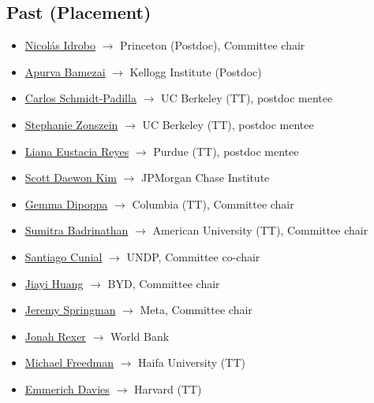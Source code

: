 \documentclass[10pt,a4paper]{article}
\begin{document}
\subsection*{Past (Placement)}
\begin{itemize}[leftmargin=1em, itemsep=1pt, topsep=2pt, label=\textcolor{secondary}{$\bullet$}]
\item \href{https://idrobo.github.io}{Nicol\'{a}s Idrobo} $\rightarrow$ Princeton (Postdoc), Committee chair
\item \href{https://www.apurvabamezai.com}{Apurva Bamezai} $\rightarrow$ Kellogg Institute (Postdoc)
\item \href{https://cschmidtpadilla.github.io/}{Carlos Schmidt-Padilla} $\rightarrow$ UC Berkeley (TT), postdoc mentee
\item \href{https://stephaniezonszein.com/}{Stephanie Zonszein} $\rightarrow$ UC Berkeley (TT), postdoc mentee
\item \href{http://lianaeustacia.com/}{Liana Eustacia Reyes} $\rightarrow$ Purdue (TT), postdoc mentee
\item \href{https://www.scottdaewonkim.com/}{Scott Daewon Kim} $\rightarrow$ JPMorgan Chase Institute
\item \href{https://www.gemmadipoppa.com}{Gemma Dipoppa} $\rightarrow$ Columbia (TT), Committee chair
\item \href{https://sumitrabadrinathan.github.io/}{Sumitra Badrinathan} $\rightarrow$ American University (TT), Committee chair
\item \href{https://www.santiagocunial.com}{Santiago Cunial} $\rightarrow$ UNDP, Committee co-chair
\item \href{https://www.linkedin.com/in/jiayihuang2016/}{Jiayi Huang} $\rightarrow$ BYD, Committee chair
\item \href{https://jrspringman.github.io}{Jeremy Springman} $\rightarrow$ Meta, Committee chair
\item \href{https://www.jonahrexer.com/}{Jonah Rexer} $\rightarrow$ World Bank
\item \href{http://mfreedman.mit.edu}{Michael Freedman} $\rightarrow$ Haifa University (TT)
\item \href{https://www.emmerichdavies.com}{Emmerich Davies} $\rightarrow$ Harvard (TT)
\end{itemize}
\end{document}
